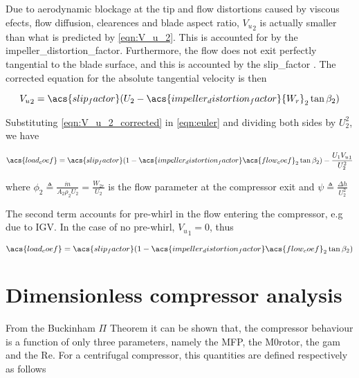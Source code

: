 \documentclass[tcc]{subfiles}
\begin{document}
Due to aerodynamic blockage at the tip and flow distortions caused by viscous efects, flow diffusion, clearences and blade aspect ratio,
${V_u}_2$ is actually smaller than what is predicted by \cref{eqn:V_u_2}.
This is accounted for by the \acf{impeller_distortion_factor}.
Furthermore, the flow does not exit perfectly tangential to the blade surface, and this is accounted by the \acf{slip_factor} \cite{Wiesner1967,Aungier1995}.
The corrected equation for the absolute tangential velocity is then

\begin{equation}
    \label{eqn:V_u_2_corrected}
    {V_u}_2 = \acs{slip_factor}(U_2 - \acs{impeller_distortion_factor}{W_r}_2 \tan\beta_2)
\end{equation}

Substituting \cref{eqn:V_u_2_corrected} in \cref{eqn:euler} and dividing both sides by ${U_2^2}$, we have

\begin{equation}
    \acs{load_coef} = \acs{slip_factor}(1-\acs{impeller_distortion_factor}\acs{flow_coef}_2\tan\beta_2) - \frac{U_1 {V_u}_1}{U_2^2} 
\end{equation}

where $\phi_2 \triangleq \frac{\dot{m}}{A_2 \rho_2 U_2} = \frac{W_{2r}}{U_2}$ is the flow parameter at the compressor exit
and $\psi \triangleq \frac{\Delta h}{U_2^2}$

The second term accounts for pre-whirl in the flow entering the compressor, e.g due to \ac{IGV}.
In the case of no pre-whirl, ${V_u}_1 = 0$, thus 

\begin{equation}
    \label{eqn:euler}
    \acs{load_coef} = \acs{slip_factor}(1-\acs{impeller_distortion_factor}\acs{flow_coef}_2\tan\beta_2)  
\end{equation}

\section{Dimensionless compressor analysis}
\label{sec:dimensionless_compressor}

From the Buckinham $\Pi$ Theorem \cite{Buckingham1914} it can be shown that,
the compressor behaviour is a function of only three parameters, namely the \acl{MFP}, the \acl{M0rotor}, the \acl{gam} and the \acl{Re}. For a centrifugal compressor, this quantities are defined respectively as follows
\end{document}
